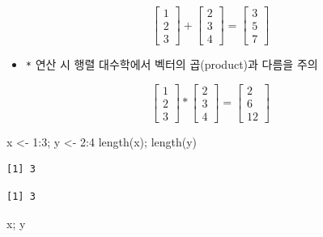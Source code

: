 \documentclass[
  11pt,
]{krantz}
\newenvironment{Shaded}{\begin{snugshade}}{\end{snugshade}}
\newcommand{\DecValTok}[1]{\textcolor[rgb]{0.06,0.06,0.06}{#1}}
\newcommand{\FunctionTok}[1]{\textcolor[rgb]{0,0,0}{#1}}
\newcommand{\NormalTok}[1]{#1}
\newcommand{\OtherTok}[1]{\textcolor[rgb]{0.37,0.37,0.37}{#1}}
\newcommand{\SpecialCharTok}[1]{\textcolor[rgb]{0,0,0}{#1}}
\providecommand{\tightlist}{%
  \setlength{\itemsep}{0pt}\setlength{\parskip}{0pt}}
\begin{document}
\[\begin{bmatrix}
1 \\ 2\\ 3
\end{bmatrix} + 
\begin{bmatrix}
2 \\ 3\\ 4
\end{bmatrix} = 
\begin{bmatrix}
3 \\ 5 \\ 7
\end{bmatrix}
\]

\begin{itemize}
\tightlist
\item
  \texttt{*} 연산 시 행렬 대수학에서 벡터의 곱(product)과 다름을 주의
\end{itemize}

\[\begin{bmatrix}
1 \\ 2\\ 3
\end{bmatrix} * 
\begin{bmatrix}
2 \\ 3\\ 4
\end{bmatrix} = 
\begin{bmatrix}
2 \\ 6 \\ 12
\end{bmatrix}
\]

\footnotesize

\begin{Shaded}
\begin{Highlighting}[]
\NormalTok{x }\OtherTok{\textless{}{-}} \DecValTok{1}\SpecialCharTok{:}\DecValTok{3}\NormalTok{; y }\OtherTok{\textless{}{-}} \DecValTok{2}\SpecialCharTok{:}\DecValTok{4}
\FunctionTok{length}\NormalTok{(x); }\FunctionTok{length}\NormalTok{(y)}
\end{Highlighting}
\end{Shaded}

\begin{verbatim}
[1] 3
\end{verbatim}

\begin{verbatim}
[1] 3
\end{verbatim}

\begin{Shaded}
\begin{Highlighting}[]
\NormalTok{x; y}
\end{Highlighting}
\end{Shaded}
\end{document}
